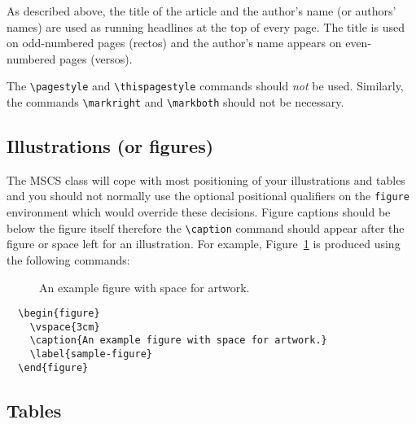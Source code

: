 \documentclass{mscs}
\begin{document}
As described above, the title of the article and the author's name (or
authors' names) are used as running headlines at the top of every page.
The title is used on odd-numbered pages (rectos) and the author's name
appears on even-numbered pages (versos).

The \verb"\pagestyle" and \verb"\thispagestyle" commands should
\emph{not} be used.
Similarly, the commands \verb"\markright" and \verb"\markboth" should not
be necessary.

\subsection{Illustrations (or figures)}

The MSCS class will cope with most positioning of your illustrations and
tables and you should not normally use the optional positional qualifiers
on the \verb"figure" environment which would override these decisions.
Figure captions should be below the figure itself therefore the
\verb"\caption" command should appear after the figure or space left for
an illustration. For example, Figure~\ref{sample-figure} is produced
using the following commands:
\begin{figure}
  \vspace{3cm}
  \caption{An example figure with space for artwork.}
  \label{sample-figure}
\end{figure}
\begin{verbatim}
  \begin{figure}
    \vspace{3cm}
    \caption{An example figure with space for artwork.}
    \label{sample-figure}
  \end{figure}
\end{verbatim}

\subsection{Tables}
\end{document}
